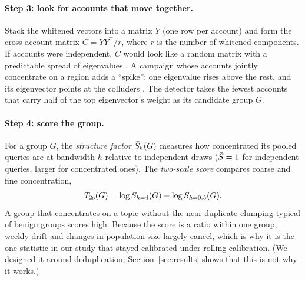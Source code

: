 \paragraph{Step 3: look for accounts that move together.} Stack the whitened vectors into a matrix $Y$ (one row per account) and form the cross-account matrix $C=YY^\top/r$, where $r$ is the number of whitened components. If accounts were independent, $C$ would look like a random matrix with a predictable spread of eigenvalues \citep{marchenko1967distribution}. A campaign whose accounts jointly concentrate on a region adds a ``spike'': one eigenvalue rises above the rest, and its eigenvector points at the colluders \citep{baik2005phase}. The detector takes the fewest accounts that carry half of the top eigenvector's weight as its candidate group $G$.

\paragraph{Step 4: score the group.} For a group $G$, the \emph{structure factor} $\bar S_h(G)$ measures how concentrated its pooled queries are at bandwidth $h$ relative to independent draws ($\bar S=1$ for independent queries, larger for concentrated ones). The \emph{two-scale score} compares coarse and fine concentration,
\begin{equation}
T_{\rm 2s}(G)=\log\bar S_{h=4}(G)-\log\bar S_{h=0.5}(G).
\end{equation}
A group that concentrates on a topic without the near-duplicate clumping typical of benign groups scores high. Because the score is a ratio within one group, weekly drift and changes in population size largely cancel, which is why it is the one statistic in our study that stayed calibrated under rolling calibration. (We designed it around deduplication; Section~\ref{sec:results} shows that this is not why it works.)


